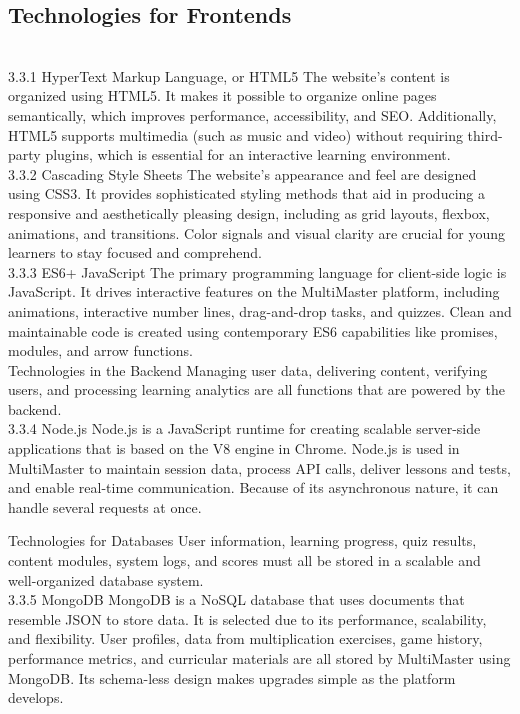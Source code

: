 \documentclass[BTech]{audiss}
\begin{document}
\subsection{Technologies for Frontends}\\
3.3.1 HyperText Markup Language, or HTML5 The website's content is organized using HTML5. It makes it possible to organize online pages semantically, which improves performance, accessibility, and SEO. Additionally, HTML5 supports multimedia (such as music and video) without requiring third-party plugins, which is essential for an interactive learning environment.\\
3.3.2 Cascading Style Sheets The website's appearance and feel are designed using CSS3. It provides sophisticated styling methods that aid in producing a responsive and aesthetically pleasing design, including as grid layouts, flexbox, animations, and transitions. Color signals and visual clarity are crucial for young learners to stay focused and comprehend. \\
3.3.3 ES6+ JavaScript The primary programming language for client-side logic is JavaScript. It drives interactive features on the MultiMaster platform, including animations, interactive number lines, drag-and-drop tasks, and quizzes. Clean and maintainable code is created using contemporary ES6 capabilities like promises, modules, and arrow functions.\\
Technologies in the Backend Managing user data, delivering content, verifying users, and processing learning analytics are all functions that are powered by the backend.\\
3.3.4 Node.js Node.js is a JavaScript runtime for creating scalable server-side applications that is based on the V8 engine in Chrome. Node.js is used in MultiMaster to maintain session data, process API calls, deliver lessons and tests, and enable real-time communication. Because of its asynchronous nature, it can handle several requests at once.

Technologies for Databases User information, learning progress, quiz results, content modules, system logs, and scores must all be stored in a scalable and well-organized database system.\\

3.3.5 MongoDB MongoDB is a NoSQL database that uses documents that resemble JSON to store data. It is selected due to its performance, scalability, and flexibility. User profiles, data from multiplication exercises, game history, performance metrics, and curricular materials are all stored by MultiMaster using MongoDB. Its schema-less design makes upgrades simple as the platform develops.\\
\end{document}
